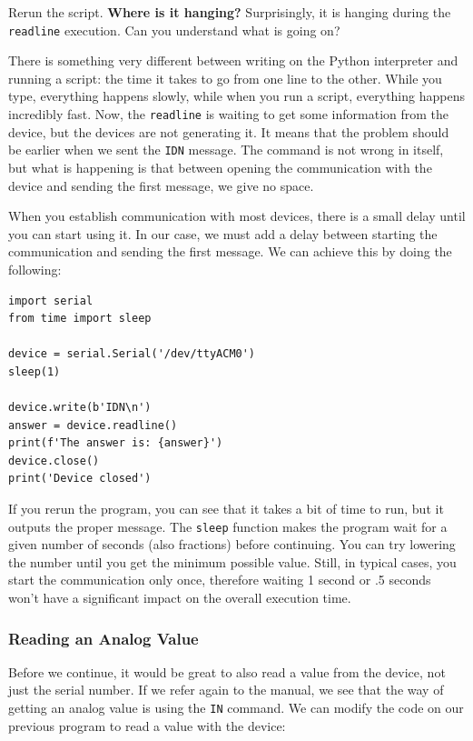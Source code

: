 Rerun the script. \textbf{Where is it hanging?} Surprisingly, it is hanging during the \texttt{readline} execution. Can you understand what is going on?

There is something very different between writing on the Python interpreter and running a script: the time it takes to go from one line to the other. While you type, everything happens slowly, while when you run a script, everything happens incredibly fast. Now, the \texttt{readline} is waiting to get some information from the device, but the devices are not generating it. It means that the problem should be earlier when we sent the \texttt{IDN} message. The command is not wrong in itself, but what is happening is that between opening the communication with the device and sending the first message, we give no space.

When you establish communication with most devices, there is a small delay until you can start using it. In our case, we must add a delay between starting the communication and sending the first message. We can achieve this by doing the following:

\begin{verbatim}
import serial
from time import sleep

device = serial.Serial('/dev/ttyACM0')
sleep(1)

device.write(b'IDN\n')
answer = device.readline()
print(f'The answer is: {answer}')
device.close()
print('Device closed')
\end{verbatim}

If you rerun the program, you can see that it takes a bit of time to run, but it outputs the proper message. The \texttt{sleep} function makes the program wait for a given number of seconds (also fractions) before continuing. You can try lowering the number until you get the minimum possible value. Still, in typical cases, you start the communication only once, therefore waiting 1 second or .5 seconds won't have a significant impact on the overall execution time.

\subsubsection{Reading an Analog Value}
Before we continue, it would be great to also read a value from the device, not just the serial number. If we refer again to the manual, we see that the way of getting an analog value is using the \texttt{IN} command. We can modify the code on our previous program to read a value with the device:

